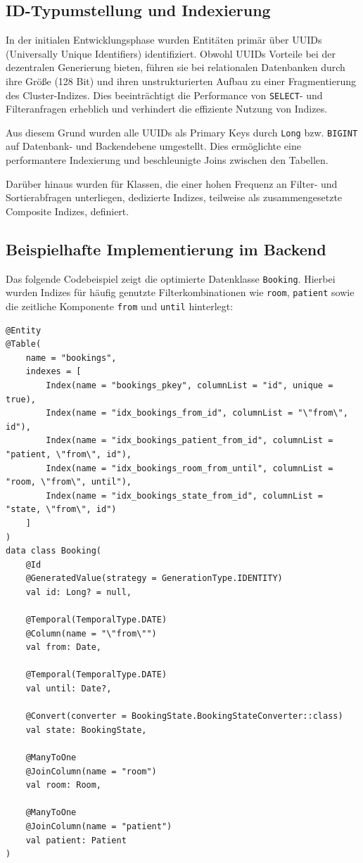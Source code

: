 \subsection*{ID-Typumstellung und Indexierung}
In der initialen Entwicklungsphase wurden Entitäten primär über UUIDs (Universally Unique Identifiers) identifiziert. 
Obwohl UUIDs Vorteile bei der dezentralen Generierung bieten, führen sie bei relationalen Datenbanken durch ihre Größe (128 Bit) und ihren unstrukturierten Aufbau zu einer Fragmentierung des Cluster-Indizes. 
Dies beeinträchtigt die Performance von \texttt{SELECT}- und Filteranfragen erheblich und verhindert die effiziente Nutzung von Indizes.

Aus diesem Grund wurden alle UUIDs als Primary Keys durch \texttt{Long} bzw. \texttt{BIGINT} auf Datenbank- und Backendebene umgestellt. Dies ermöglichte eine performantere Indexierung und beschleunigte Joins zwischen den Tabellen. 

Darüber hinaus wurden für Klassen, die einer hohen Frequenz an Filter- und Sortierabfragen unterliegen, dedizierte Indizes, teilweise als zusammengesetzte Composite Indizes, definiert.

\subsection*{Beispielhafte Implementierung im Backend}
Das folgende Codebeispiel zeigt die optimierte Datenklasse \texttt{Booking}. Hierbei wurden Indizes für häufig genutzte Filterkombinationen wie \texttt{room}, \texttt{patient} sowie die zeitliche Komponente \texttt{from} und \texttt{until} hinterlegt:

\begin{lstlisting}[style=kotlinstyle, caption={Optimierte Booking-Entität}]
@Entity
@Table(
    name = "bookings",
    indexes = [
        Index(name = "bookings_pkey", columnList = "id", unique = true),
        Index(name = "idx_bookings_from_id", columnList = "\"from\", id"),
        Index(name = "idx_bookings_patient_from_id", columnList = "patient, \"from\", id"),
        Index(name = "idx_bookings_room_from_until", columnList = "room, \"from\", until"),
        Index(name = "idx_bookings_state_from_id", columnList = "state, \"from\", id")
    ]
)
data class Booking(
    @Id
    @GeneratedValue(strategy = GenerationType.IDENTITY)
    val id: Long? = null,

    @Temporal(TemporalType.DATE)
    @Column(name = "\"from\"")
    val from: Date,

    @Temporal(TemporalType.DATE)
    val until: Date?,

    @Convert(converter = BookingState.BookingStateConverter::class)
    val state: BookingState,

    @ManyToOne
    @JoinColumn(name = "room")
    val room: Room,

    @ManyToOne
    @JoinColumn(name = "patient")
    val patient: Patient
)
\end{lstlisting}